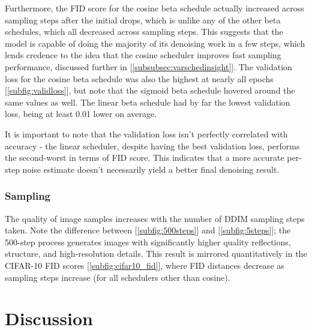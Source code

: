 \documentclass[10pt,twocolumn,letterpaper]{article}
\begin{document}
\hfill

Furthermore, the FID score for the cosine beta schedule actually increased across sampling steps after the initial drops, which is unlike any of the other beta schedules, which all decreased across sampling steps. This suggests that the model is capable of doing the majority of its denoising work in a few steps, which lends credence to the idea that the cosine scheduler improves fast sampling performance, discussed further in [\ref{subsubsec:varschedinsight}]. The validation loss for the cosine beta schedule was also the highest at nearly all epochs [\ref{subfig:validloss}], but note that the sigmoid beta schedule hovered around the same values as well. The linear beta schedule had by far the lowest validation loss, being at least 0.01 lower on average.

\hfill

It is important to note that the validation loss isn't perfectly correlated with accuracy - the linear scheduler, despite having the best validation loss, performs the second-worst in terms of FID score. This indicates that a more accurate per-step noise estimate doesn't necessarily yield a better final denoising result.

\subsubsection{Sampling}
\label{subsec:sampling_results}


The quality of image samples increases with the number of DDIM sampling steps taken. Note the difference between [\ref{subfig:500steps}] and [\ref{subfig:5steps}]; the 500-step process generates images with significantly higher quality reflections, structure, and high-resolution details. This result is mirrored quantitatively in the CIFAR-10 FID scores [\ref{subfig:cifar10_fid}], where FID distances decrease as sampling steps increase (for all schedulers other than cosine). 

\section{Discussion}
\end{document}
